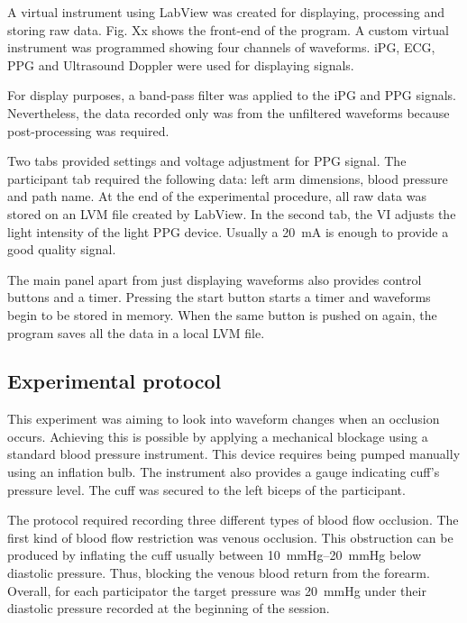 A virtual instrument using LabView was created for displaying, processing and storing raw data. Fig. Xx shows the front-end of the program. A custom virtual instrument was programmed showing four channels of waveforms. iPG, ECG, PPG and Ultrasound Doppler were used for displaying signals.


For display purposes, a band-pass filter was applied to the iPG and PPG signals. Nevertheless, the data recorded only was from the unfiltered waveforms because post-processing was required.  


Two tabs provided settings and voltage adjustment for PPG signal. The participant tab required the following data: left arm dimensions, blood pressure and path name. At the end of the experimental procedure, all raw data was stored on an LVM file created by LabView. In the second tab, the VI adjusts the light intensity of the light PPG device. Usually a \SI{20}{\milli\ampere} is enough to provide a good quality signal. 

The main panel apart from just displaying waveforms also provides control buttons and a timer.  Pressing the start button starts a timer and waveforms begin to be stored in memory. When the same button is pushed on again, the program saves all the data in a local LVM file. 



\subsection{Experimental protocol}

\label{section4.1.3}

This experiment was aiming to look into waveform changes when an occlusion occurs. Achieving this is possible by applying a mechanical blockage using a standard blood pressure instrument. This device requires being pumped manually using an inflation bulb. The instrument also provides a gauge indicating cuff's pressure level. The cuff was secured to the left biceps of the participant. 

The protocol required recording three different types of blood flow occlusion. The first kind of blood flow restriction was venous occlusion.  This obstruction can be produced by inflating the cuff usually between \SIrange{10}{20}{\mmHg} below diastolic pressure. Thus, blocking the venous blood return from the forearm.  Overall, for each participator the target pressure was \SI{20}{\mmHg} under their diastolic pressure recorded at the beginning of the session. 

